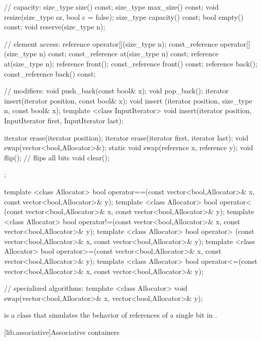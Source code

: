 \begin{codeblock}
{{    // capacity:
    size_type size() const;
    size_type max_size() const;
    void      resize(size_type sz, bool c = false);
    size_type capacity() const;
    bool      empty() const;
    void      reserve(size_type n);

    // element access:
    reference       operator[](size_type n);
    const_reference operator[](size_type n) const;
    const_reference at(size_type n) const;
    reference       at(size_type n);
    reference       front();
    const_reference front() const;
    reference       back();
    const_reference back() const;

    // modifiers:
    void push_back(const bool& x);
    void pop_back();
    iterator insert(iterator position, const bool& x);
    void     insert (iterator position, size_type n, const bool& x);
    template <class InputIterator>
        void insert(iterator position,
                    InputIterator first, InputIterator last);

    iterator erase(iterator position);
    iterator erase(iterator first, iterator last);
    void swap(vector<bool,Allocator>&);
    static void swap(reference x, reference y);
    void flip();                // flips all bits
    void clear();
  };

  template <class Allocator>
    bool operator==(const vector<bool,Allocator>& x,
                    const vector<bool,Allocator>& y);
  template <class Allocator>
    bool operator< (const vector<bool,Allocator>& x,
                    const vector<bool,Allocator>& y);
  template <class Allocator>
    bool operator!=(const vector<bool,Allocator>& x,
                    const vector<bool,Allocator>& y);
  template <class Allocator>
    bool operator> (const vector<bool,Allocator>& x,
                    const vector<bool,Allocator>& y);
  template <class Allocator>
    bool operator>=(const vector<bool,Allocator>& x,
                    const vector<bool,Allocator>& y);
  template <class Allocator>
    bool operator<=(const vector<bool,Allocator>& x,
                    const vector<bool,Allocator>& y);

  // specialized algorithms:
  template <class Allocator>
    void swap(vector<bool,Allocator>& x, vector<bool,Allocator>& y);
}
\end{codeblock}%

\pnum
{}
is a class that simulates the behavior of references of a single bit in
.

[lib.associative]{Associative containers}

